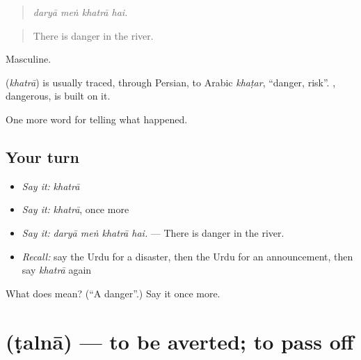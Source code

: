 \begin{quote}
   
\end{quote}

\begin{quote}
\emph{daryā meṅ khatrā hai.}
\end{quote}

\begin{quote}
There is danger in the river.
\end{quote}

Masculine.

\begin{cousinweb}
\textbf{} (\emph{khatrā}) is usually traced, through Persian, to Arabic \emph{khaṭar}, \textquotedblleft{}danger, risk\textquotedblright{}. \textbf{}, dangerous, is built on it.
\end{cousinweb}

\begin{grammarlens}[title={What you've built}]
One more word for telling what happened.
\end{grammarlens}

\subsection*{Your turn}
\begin{itemize}
\raggedright
  \item \emph{Say it:} \emph{khatrā}
  \item \emph{Say it:} \emph{khatrā}, once more
  \item \emph{Say it:} \emph{daryā meṅ khatrā hai.} — There is danger in the river.
  \item \emph{Recall:} say the Urdu for a disaster, then the Urdu for an announcement, then say \emph{khatrā} again
\end{itemize}

\begin{tcolorbox}[breakable,colback=teal!4,colframe=teal!35!black,title={Before you move on}]
What does  mean? (\textquotedblleft{}A danger\textquotedblright{}.) Say it once more.
\end{tcolorbox}
\section[\texorpdfstring{\ur{ٹلنا} (ṭalnā)}{ٹلنا (ṭalnā)}]{ (ṭalnā) — to be averted; to pass off}

\label{lesson:UR-C290-ttalna}



